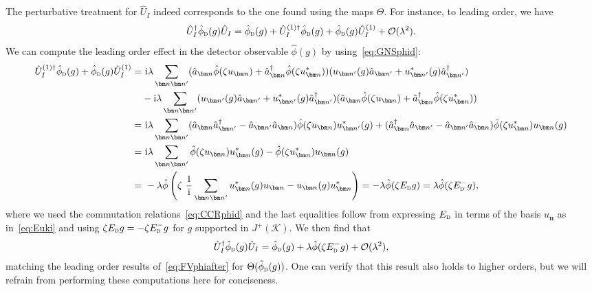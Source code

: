 \documentclass[letterpaper,12pt,titlepage,oneside,final]{book}
\newcommand{\ii}{\mathrm{i}}
\newcommand{\tc}[1]{\textsc{#1}}
\begin{document}
The perturbative treatment for $\hat{U}_I$ indeed corresponds to the one found using the maps $\Theta$. For instance, to leading order, we have
\begin{equation}
    \hat{U}_I^\dagger \hat{\phi}_\tc{d}(g)\hat{U}_I = \hat{\phi}_\tc{d}(g) + \hat{U}_I^{(1)\dagger} \hat{\phi}_\tc{d}(g) + \hat{\phi}_\tc{d}(g) \hat{U}_I^{(1)} + \mathcal{O}(\lambda^2).
\end{equation}
We can compute the leading order effect in the detector observable $\hat{\phi}(g)$ by using~\eqref{eq:GNSphid}:
\begin{align}
    \hat{U}_I^{(1)\dagger} \hat{\phi}_\tc{d}(g) + \hat{\phi}_\tc{d}(g) \hat{U}_I^{(1)} =&\,\,\ii \lambda \sum_{\bm n \bm n'} (\hat{a}_{\bm n} \hat{\phi}(\zeta u_{\bm n})+\hat{a}_{\bm n}^\dagger \hat{\phi}(\zeta u_{\bm n}^*))(u_{\bm n'}(g) \hat{a}_{\bm n'} + u_{\bm n'}^*(g) \hat{a}_{\bm n'}^\dagger) \\&- \ii \lambda \sum_{\bm n \bm n'} (u_{\bm n'}(g) \hat{a}_{\bm n'} + u_{\bm n'}^*(g) \hat{a}_{\bm n'}^\dagger)(\hat{a}_{\bm n} \hat{\phi}(\zeta u_{\bm n})+\hat{a}_{\bm n}^\dagger \hat{\phi}(\zeta u_{\bm n}^*))\nonumber\\ = &\,\, \ii \lambda \sum_{\bm n \bm n'} (\hat{a}_{\bm n} \hat{a}_{\bm n'}^\dagger - \hat{a}_{\bm n'} \hat{a}_{\bm n})\hat{\phi}(\zeta u_{\bm n}) u_{\bm n'}^*(g) + (\hat{a}_{\bm n}^\dagger \hat{a}_{\bm n'} - \hat{a}_{\bm n'} \hat{a}_{\bm n}) \hat{\phi}(\zeta u_{\bm n}^*)u_{\bm n}(g)\nonumber\\
    =& \,\,\ii \lambda \sum_{\bm n \bm n'} \hat{\phi}(\zeta u_{\bm n}) u_{\bm n}^*(g) - \hat{\phi}(\zeta u_{\bm n}^*) u_{\bm n}(g)\nonumber\\
    =&\,\, - \lambda \hat{\phi}\left(\zeta\,\, \frac{1}{\ii}\sum_{\bm n \bm n'} u_{\bm n}^*(g) u_{\bm n} - u_{\bm n}(g) u_{\bm n}^*\right) = -\lambda \hat{\phi}(\zeta E_\tc{d}g) = \lambda \hat{\phi}(\zeta E_\tc{d}^-g),\nonumber
\end{align}
where we used the commutation relations~\eqref{eq:CCRphid} and the last equalities follow from expressing $E_\tc{d}$ in terms of the basis $u_{\bm n}$ as in~\eqref{eq:Euki} and using $\zeta E_\tc{d} g = -\zeta E_\tc{d}^- g$ for $g$ supported in $J^+(\mathcal{K})$. We then find that
\begin{equation}
    \hat{U}_I^\dagger \hat{\phi}_\tc{d}(g)\hat{U}_I = \hat{\phi}_{\tc{d}}(g) + \lambda \hat{\phi}(\zeta E_\tc{d}^-g) + \mathcal{O}(\lambda^2),
\end{equation}
matching the leading order results of~\eqref{eq:FVphiafter} for $\Theta(\hat{\phi}_\tc{d}(g))$. One can verify that this result also holds to higher orders, but we will refrain from performing these computations here for conciseness.
\end{document}
